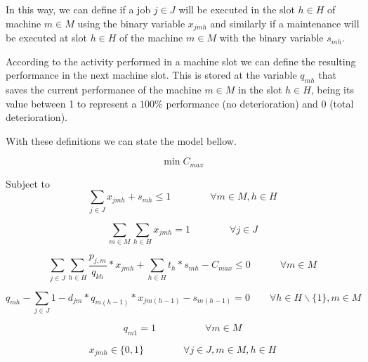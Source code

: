 \documentclass[a4paper,11pt]{article}
\begin{document}
In this way, we can define if a job $j \in J$ will be executed in the slot $h \in H$ of machine $m \in M$  using the binary variable $x_{jmh}$ and similarly if a maintenance will be executed at slot $h \in H$ of the machine $m \in M$ with the binary variable $s_{mh}$.

According to the activity performed in a machine slot we can define the resulting performance in the next machine slot. This is stored at the variable $q_{mh}$ that saves the current performance of the machine $m \in M$ in the slot $h \in H$, being its value between 1 to represent a $100\%$ performance (no deterioration) and 0 (total deterioration).

With these definitions we can state the model bellow. 

\begin{equation}\label{eq:fo_mod1}
	\min C_{max}
\end{equation}

Subject to
\begin{equation}\label{eq:uniqueAct_mod1}	
 \sum_{j \in J}{x_{jmh}} +  s_{mh} \leq 1 \quad\quad\quad\quad \forall m \in M, h \in H 
\end{equation}

\begin{equation}\label{eq:mandJob_mod1}
	\sum_{m \in M}\sum_{h \in H}{x_{jmh}} = 1 \quad\quad\quad\quad \forall j \in J
\end{equation}
 
\begin{equation}\label{eq:cMax_mod1}
	\sum_{j \in J}\sum_{h \in H}{\frac{p_{j,m}}{q_{kh}}*x_{jmh}} + \sum_{h \in H}{t_h}*s_{mh} - C_{max} \leq 0 \quad \quad \quad \forall m \in M 
\end{equation} 
 
\begin{equation}\label{eq:det_mod1}
	q_{mh} - \sum_{j \in J}{1-d_{jm}}*q_{m(h-1)}*x_{jm(h-1)} - s_{m(h-1)} = 0 \quad\quad \forall h \in H\backslash\{1\} , m \in M
\end{equation} 

\begin{equation}\label{eq:qInit_mod1}
q_{m1} = 1 \quad\quad\quad\quad\quad \forall m \in M
\end{equation}

\begin{equation}\label{eq:xDef_mod1}
    x_{jmh} \in \{0,1\} \quad \quad \quad \quad \forall j \in J, m \in M, h \in H
\end{equation}
\end{document}
